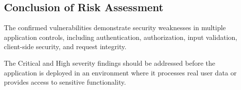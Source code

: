 \subsection*{Conclusion of Risk Assessment}

The confirmed vulnerabilities demonstrate security weaknesses in
multiple application controls, including authentication,
authorization, input validation, client-side security, and request
integrity.

The Critical and High severity findings should be addressed before
the application is deployed in an environment where it processes
real user data or provides access to sensitive functionality.